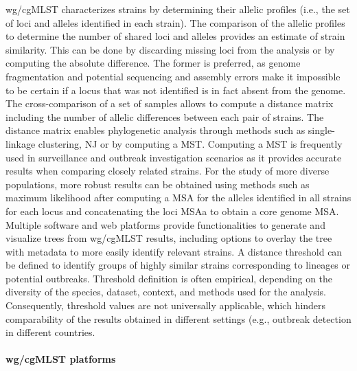 \ac{wg/cgMLST} characterizes strains by determining their allelic profiles (i.e., the set of loci and alleles identified in each strain). The comparison of the allelic profiles to determine the number of shared loci and alleles provides an estimate of strain similarity. This can be done by discarding missing loci from the analysis or by computing the absolute difference. The former is preferred, as genome fragmentation and potential sequencing and assembly errors make it impossible to be certain if a locus that was not identified is in fact absent from the genome. The cross-comparison of a set of samples allows to compute a distance matrix including the number of allelic differences between each pair of strains. The distance matrix enables phylogenetic analysis through methods such as single-linkage clustering, \ac{NJ} or by computing a \ac{MST}. Computing a \ac{MST} is frequently used in surveillance and outbreak investigation scenarios as it provides accurate results when comparing closely related strains. For the study of more diverse populations, more robust results can be obtained using methods such as maximum likelihood after computing a \ac{MSA} for the alleles identified in all strains for each locus and concatenating the loci \ac{MSA}a to obtain a core genome \ac{MSA}. Multiple software and web platforms provide functionalities to generate and visualize trees from \ac{wg/cgMLST} results, including options to overlay the tree with metadata to more easily identify relevant strains. A distance threshold can be defined to identify groups of highly similar strains corresponding to lineages or potential outbreaks. Threshold definition is often empirical, depending on the diversity of the species, dataset, context, and methods used for the analysis. Consequently, threshold values are not universally applicable, which hinders comparability of the results obtained in different settings (e.g., outbreak detection in different countries.

\paragraph{wg/cgMLST platforms} \mbox{}\\

